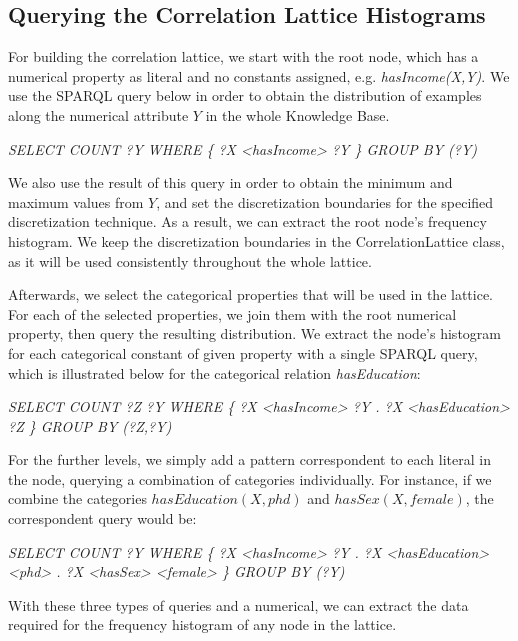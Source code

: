 \subsection{Querying the Correlation Lattice Histograms}

For building the correlation lattice, we start with the root node, which has a numerical property as literal and no
constants assigned, e.g. \emph{hasIncome(X,Y)}. We use the SPARQL query below in order to obtain the  distribution of 
examples along the numerical attribute $Y$ in the whole Knowledge Base.

\begin{center}
 \emph{SELECT COUNT ?Y WHERE \{ ?X <hasIncome> ?Y \} GROUP BY (?Y)}
\end{center}

We also use the result of this query in order to obtain the minimum and maximum values from $Y$, and set the
discretization boundaries for the specified discretization technique. As a result, we can extract the root
node's frequency histogram. We keep the discretization boundaries in the CorrelationLattice class, as it will be used
consistently throughout the whole lattice.

Afterwards, we select the categorical properties that will be used in the lattice. For each of the selected
properties, we join them with the root numerical property, then query the resulting distribution. We extract the node's
histogram for each categorical constant of given property with a single SPARQL query, which is illustrated below for the
categorical relation \emph{hasEducation}:

\begin{center}
 \emph{SELECT COUNT ?Z ?Y WHERE \{ ?X <hasIncome> ?Y . ?X <hasEducation> ?Z \} GROUP BY (?Z,?Y)}
\end{center}

For the further levels, we simply add a pattern correspondent to each literal in the node, querying a combination of
categories individually. For instance, if we combine the categories $hasEducation(X,phd)$ and $hasSex(X,female)$, the
correspondent query would be:

\begin{center}
 \emph{SELECT COUNT ?Y WHERE \{ ?X <hasIncome> ?Y . ?X <hasEducation> <phd> . ?X <hasSex> <female> \} GROUP BY (?Y)}
\end{center}

With these three types of queries and a numerical, we can extract the data required for the frequency histogram of any
node in the lattice.




% 



